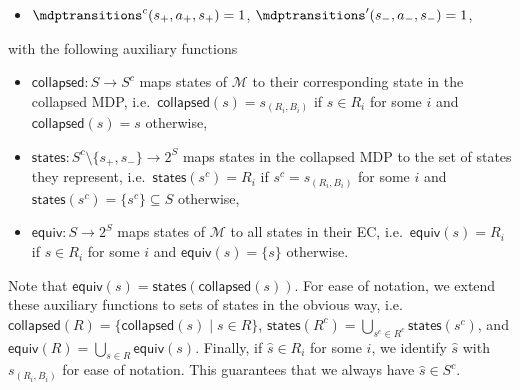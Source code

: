 \documentclass{article}
\newcommand{\UnionSym}{\bigcup}
\newcommand{\Union}{\UnionSym}
\newcommand{\MDP}{\mathcal{M}}
\newcommand{\States}{S}
\newcommand{\initialstate}{\hat{s}}
\newcommand{\targetstate}{s_+}
\newcommand{\sinkstate}{s_-}
\newcommand{\ecequivalent}{\mathsf{equiv}}
\newcommand{\eccollapsed}{\mathsf{collapsed}}
\newcommand{\ecstates}{\mathsf{states}}
\begin{document}
\begin{definition}
\begin{itemize}
\begin{itemize}
			\item $\mdptransitions^c(\targetstate, a_+, \targetstate) = 1$, $\mdptransitions'(\sinkstate, a_-, \sinkstate) = 1$,
		\end{itemize}
	\end{itemize}
	with the following auxiliary functions
	\begin{itemize}
		\item $\eccollapsed : \States \to \States^c$ maps states of $\MDP$ to their corresponding state in the collapsed MDP, i.e.\ $\eccollapsed(s) = s_{(R_i, B_i)}$ if $s \in R_i$ for some $i$ and $\eccollapsed(s) = s$ otherwise,
		\item $\ecstates : \States^c \setminus \{\targetstate, \sinkstate\} \to 2^\States$ maps states in the collapsed MDP to the set of states they represent, i.e.\ $\ecstates(s^c) = R_i$ if $s^c = s_{(R_i,B_i)}$ for some $i$ and $\ecstates(s^c) = \{s^c\} \subseteq \States$ otherwise,
		\item $\ecequivalent : \States \to 2^\States$ maps states of $\MDP$ to all states in their EC, i.e.\ $\ecequivalent(s) = R_i$ if $s \in R_i$ for some $i$ and $\ecequivalent(s) = \{s\}$ otherwise.
	\end{itemize}
	Note that $\ecequivalent(s) = \ecstates(\eccollapsed(s))$.
	For ease of notation, we extend these auxiliary functions to sets of states in the obvious way, i.e.\ $\eccollapsed(R) = \{\eccollapsed(s) \mid s \in R\}$, $\ecstates(R^c) = \Union_{s^c \in R^c} \ecstates(s^c)$, and $\ecequivalent(R) = \Union_{s \in R} \ecequivalent(s)$.
	Finally, if $\initialstate \in R_i$ for some $i$, we identify $\initialstate$ with $s_{(R_i, B_i)}$ for ease of notation.
	This guarantees that we always have $\initialstate \in \States^c$.
\end{definition}
\end{document}
